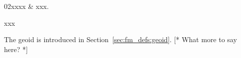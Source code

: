 %
%
 \label{sec:ppath}

%
%
\starthistory
  02xxxx & xxx.\\
\stophistory


%
%
%



xxx



\label{sec:ppath:geoids}

The geoid is introduced in Section~\ref{sec:fm_defs:geoid}. [* What more
to say here? *]


